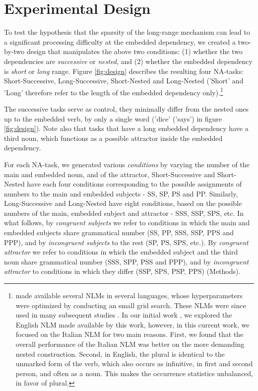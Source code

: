 \section{Experimental Design}
To test the hypothesis that the sparsity of the long-range mechanism can lead to a significant processing difficulty at the embedded dependency, we created a two-by-two design that manipulates the above two conditions: (1) whether the two dependencies are \textit{successive} or \textit{nested}, and (2) whether the embedded dependency is \textit{short} or \textit{long} range. Figure \ref{fig:design} describes the resulting four NA-tasks: Short-Successive, Long-Successive, Short-Nested and Long-Nested ('Short' and 'Long' therefore refer to the length of the embedded dependency only).\footnote{\citet{Gulordava:etal:2018} made available several NLMs in several languages, whose hyperparameters were optimized by conducting an small grid search. 
These NLMs were since used in many subsequent studies \citep{Giulianelli:etal:2018, jumelet2019analysing, wilcox2018rnn, futrell2019neural}.
In our initial work \citep{lakretz2019emergence}, we explored the English NLM made available by this work, however, in this current work, we focused on the Italian NLM for two main reasons. 
First, we found that the overall performance of the Italian NLM was better on the more demanding nested construction. Second, in English, the plural is identical to the unmarked form of the verb, which also occurs as infinitive, in first and second person, and often as a noun. This makes the occurrence statistics unbalanced, in favor of plural.} 

The successive tasks serve as control, they minimally differ from the nested ones up to the embedded verb, by only a single word ('dice' ('says') in figure \ref{fig:design}). Note also that tasks that have a long embedded dependency have a third noun, which functions as a possible attractor inside the embedded dependency.

For each NA-task, we generated various \textit{conditions} by varying the number of the main and embedded noun, and of the attractor, Short-Successive and Short-Nested have each four conditions corresponding to the possible assignments of numbers to the main and embedded subjects - SS, SP, PS and PP. Similarly, Long-Successive and Long-Nested have eight conditions, based on the possible numbers of the main, embedded subject and attractor - SSS, SSP, SPS, etc. In what follows, by \textit{congruent subjects} we refer to conditions in which the main and embedded subjects share grammatical number (SS, PP, SSS, SSP, PPS and PPP), and by \textit{incongruent subjects} to the rest (SP, PS, SPS, etc.). By \textit{congruent attractor} we refer to conditions in which the embedded subject and the third noun share grammatical number (SSS, SPP, PSS and PPP), and by \textit{incongruent attractor} to conditions in which they differ (SSP, SPS, PSP, PPS) (Methods). 

